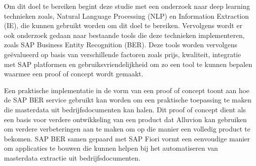 Om dit doel te bereiken begint deze studie met een onderzoek naar deep learning technieken zoals, Natural Language Processing (NLP) en Information Extraction (IE), die kunnen gebruikt worden om dit doel te bereiken. Vervolgens wordt er ook onderzoek gedaan naar bestaande tools die deze technieken implementeren, zoals SAP Business Entity Recognition (BER). Deze tools worden vervolgens geëvalueerd op basis van verschillende factoren zoals prijs, kwaliteit, integratie met SAP platformen en gebruiksvriendelijkheid om zo een tool te kunnen bepalen waarmee een proof of concept wordt gemaakt.

Een praktische implementatie in de vorm van een proof of concept toont aan hoe de SAP BER service gebruikt kan worden om een praktische toepassing te maken die masterdata uit bedrijfsdocumenten kan halen. Dit proof of concept dient als een basis voor verdere ontwikkeling van een product dat Alluvion kan gebruiken om verdere verbeteringen aan te maken om op die manier een volledig product te bekomen. SAP BER samen gepaard met SAP Fiori vormt een eenvoudige manier om applicaties te bouwen die kunnen helpen bij het automatiseren van masterdata extractie uit bedrijfsdocumenten.


